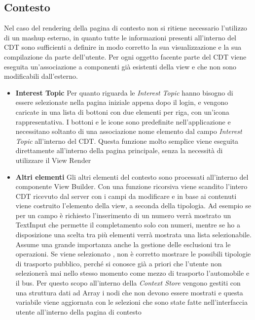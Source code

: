 \subsection{Contesto} 
Nel caso del rendering della pagina di contesto non si ritiene necessario l'utilizzo di un mashup esterno, in quanto tutte le informazioni presenti all'interno del CDT sono sufficienti a definire in modo corretto la sua visualizzazione e la sua compilazione da parte dell'utente.
	Per ogni oggetto facente parte del CDT viene eseguita un'associazione a componenti già esistenti della view e che non sono modificabili dall'esterno.
	\begin{itemize}
		\item \textbf{Interest Topic} Per quanto riguarda le \emph{Interest Topic} hanno bisogno di essere selezionate nella pagina iniziale appena dopo il login, e vengono caricate in una lista di bottoni con due elementi per riga, con un'icona rappresentativa. I bottoni e le icone sono predefinite nell'applicazione e necessitano soltanto di una associazione nome elemento dal campo \emph{Interest Topic} all'interno del CDT. Questa funzione molto semplice viene eseguita direttamente all'interno della pagina principale, senza la necessità di utilizzare il View Render
		\item \textbf{Altri elementi} Gli altri elementi del contesto sono processati all'interno del componente View Builder. Con una funzione ricorsiva viene scandito l'intero CDT ricevuto dal server con i campi da modificare e in base ai contenuti viene costruito l'elemento della view, a seconda della tipologia. Ad esempio se per un campo è richiesto l'inserimento di un numero verrà mostrato un TextInput che permette il completamento solo con numeri, mentre se ho a disposizione una scelta tra più elementi verrà mostrata una lista selezionabile.
		Assume una grande importanza anche la gestione delle esclusioni tra le operazioni. Se viene selezionato , non è corretto mostrare le possibili tipologie di trasporto pubblico, perché si conosce già a priori che l'utente non selezionerà mai nello stesso momento come mezzo di trasporto l'automobile e il bus. Per questo scopo all'interno della \emph{Context Store} vengono gestiti con una struttura dati ad Array i nodi che non devono essere mostrati e questa variabile viene aggiornata con le selezioni che sono state fatte nell'interfaccia utente all'interno della pagina di contesto
	\end{itemize}
	
